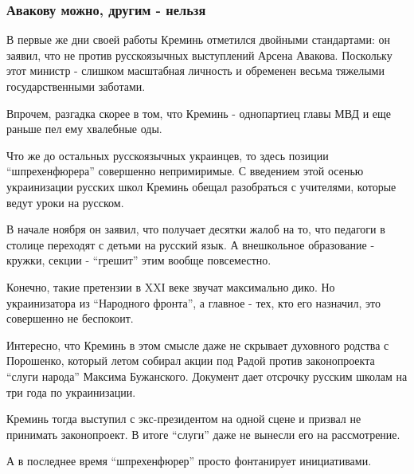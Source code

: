  
 
 
 
 

\subsubsection{Авакову можно, другим - нельзя}
\label{sec:02_12_2020.news.ua.strana.venk_victoria.1.mova_shtrafy_ukrainizacia.avakov_mozhno}

В первые же дни своей работы Креминь отметился двойными стандартами: он заявил,
что не против русскоязычных выступлений Арсена Авакова. Поскольку этот министр
- слишком масштабная личность и обременен весьма тяжелыми государственными
заботами. 

Впрочем, разгадка скорее в том, что Креминь - однопартиец главы МВД и еще
раньше пел ему хвалебные оды. 

Что же до остальных русскоязычных украинцев, то здесь позиции \enquote{шпрехенфюрера}
совершенно непримиримые. С введением этой осенью украинизации русских школ
Креминь обещал разобраться с учителями, которые ведут уроки на русском.

В начале ноября он заявил, что получает десятки жалоб на то, что педагоги в
столице переходят с детьми на русский язык. А внешкольное образование - кружки,
секции - \enquote{грешит} этим вообще повсеместно. 

Конечно, такие претензии в XXІ веке звучат максимально дико. Но украинизатора
из \enquote{Народного фронта}, а главное - тех, кто его назначил, это совершенно не
беспокоит. 

Интересно, что Креминь в этом смысле даже не скрывает духовного родства с
Порошенко, который летом собирал акции под Радой против законопроекта
\enquote{слуги народа} Максима Бужанского. Документ дает отсрочку русским школам на
три года по украинизации.

Креминь тогда выступил с экс-президентом на одной сцене и призвал не принимать
законопроект. В итоге \enquote{слуги} даже не вынесли его на рассмотрение. 

А в последнее время \enquote{шпрехенфюрер} просто фонтанирует инициативами.

